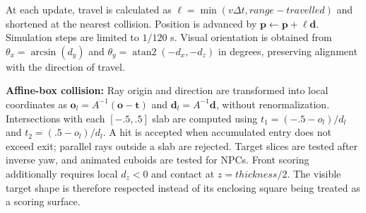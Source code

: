 At each update, travel is calculated as $\ell=\min(v\Delta t,range-travelled)$ and shortened at the nearest collision. Position is advanced by $\mathbf p\leftarrow\mathbf p+\ell\mathbf d$. Simulation steps are limited to $1/120$ s. Visual orientation is obtained from $\theta_x=\arcsin(d_y)$ and $\theta_y=\operatorname{atan2}(-d_x,-d_z)$ in degrees, preserving alignment with the direction of travel.

\textbf{Affine-box collision:} Ray origin and direction are transformed into local coordinates as $\mathbf o_l=A^{-1}(\mathbf o-\mathbf t)$ and $\mathbf d_l=A^{-1}\mathbf d$, without renormalization. Intersections with each $[-.5,.5]$ slab are computed using $t_1=(-.5-o_l)/d_l$ and $t_2=(.5-o_l)/d_l$. A hit is accepted when accumulated entry does not exceed exit; parallel rays outside a slab are rejected. Target slices are tested after inverse yaw, and animated cuboids are tested for NPCs. Front scoring additionally requires local $d_z<0$ and contact at $z=thickness/2$. The visible target shape is therefore respected instead of its enclosing square being treated as a scoring surface.

